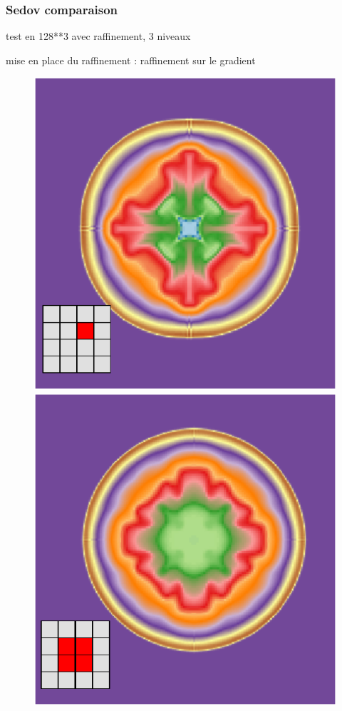 \subsubsection{Sedov comparaison}

test en 128**3 avec raffinement, 3 niveaux

mise en place du raffinement :
raffinement sur le gradient 

\begin{figure}[bth]
        \includegraphics[width=.95\linewidth]{img/03/sedov/slice_therm1.pdf} 
		\includegraphics[width=.95\linewidth]{img/03/sedov/slice_therm4.pdf} 

\end{figure}
